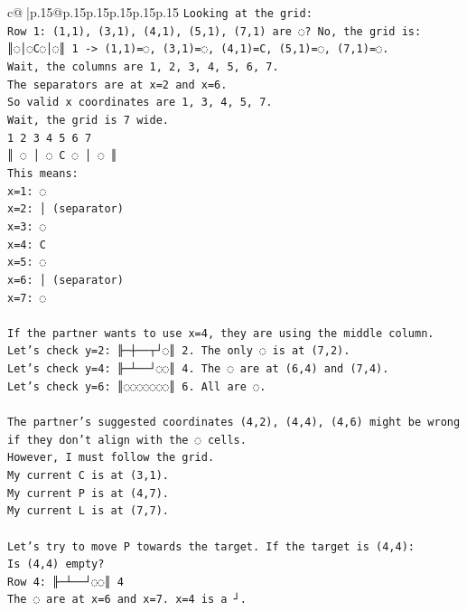 \documentclass{article}
\begin{document}
{\begin{supertabular}{c@{$\;$}|p{.15\linewidth}@{}p{.15\linewidth}p{.15\linewidth}p{.15\linewidth}p{.15\linewidth}p{.15\linewidth}}
{{{\texttt{Looking at the grid:} \\
\texttt{Row 1: (1,1), (3,1), (4,1), (5,1), (7,1) are ◌? No, the grid is:} \\
\texttt{║◌│◌C◌│◌║ 1 {-}> (1,1)=◌, (3,1)=◌, (4,1)=C, (5,1)=◌, (7,1)=◌.} \\
\texttt{Wait, the columns are 1, 2, 3, 4, 5, 6, 7.} \\
\texttt{The separators are at x=2 and x=6.} \\
\texttt{So valid x coordinates are 1, 3, 4, 5, 7.} \\
\texttt{Wait, the grid is 7 wide.} \\
\texttt{1 2 3 4 5 6 7} \\
\texttt{║ ◌ │ ◌ C ◌ │ ◌ ║} \\
\texttt{This means:} \\
\texttt{x=1: ◌} \\
\texttt{x=2: │ (separator)} \\
\texttt{x=3: ◌} \\
\texttt{x=4: C} \\
\texttt{x=5: ◌} \\
\texttt{x=6: │ (separator)} \\
\texttt{x=7: ◌} \\
\\ 
\texttt{If the partner wants to use x=4, they are using the middle column.} \\
\texttt{Let's check y=2: ╟─┼──┬┘◌║ 2. The only ◌ is at (7,2).} \\
\texttt{Let's check y=4: ╟─┴──┘◌◌║ 4. The ◌ are at (6,4) and (7,4).} \\
\texttt{Let's check y=6: ║◌◌◌◌◌◌◌║ 6. All are ◌.} \\
\\ 
\texttt{The partner's suggested coordinates (4,2), (4,4), (4,6) might be wrong if they don't align with the ◌ cells.} \\
\texttt{However, I must follow the grid.} \\
\texttt{My current C is at (3,1).} \\
\texttt{My current P is at (4,7).} \\
\texttt{My current L is at (7,7).} \\
\\ 
\texttt{Let's try to move P towards the target. If the target is (4,4):} \\
\texttt{Is (4,4) empty?} \\
\texttt{Row 4: ╟─┴──┘◌◌║ 4} \\
\texttt{The ◌ are at x=6 and x=7. x=4 is a ┘.} \\
}}}
\end{supertabular}}
\end{document}
